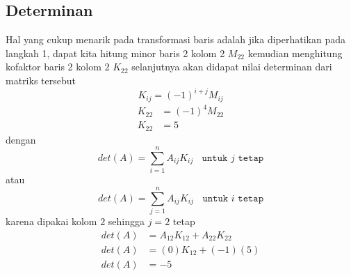 \documentclass{article}   %
\begin{document}
		\subsection[]{Determinan}Hal yang cukup menarik pada transformasi baris adalah jika diperhatikan pada langkah 1, dapat kita hitung minor baris 2 kolom 2 $M_{22}$ kemudian menghitung kofaktor baris 2 kolom 2 $K_{22}$ selanjutnya akan didapat nilai determinan dari matriks tersebut
		$$K_{ij} = (-1)^{i+j}M_{ij}$$
		\begin{align*}
			K_{22} &= (-1)^{4}M_{22}\\
			K_{22} &= 5
		\end{align*}
		dengan
		$$det(A)=\sum_{i=1}^{n} A_{ij}K_{ij}~~~~ \texttt{untuk $j$ tetap}$$
		atau 
		$$det(A)=\sum_{j=1}^{n} A_{ij}K_{ij}~~~~ \texttt{untuk $i$ tetap}$$
		karena dipakai kolom $2$ sehingga $j=2$ tetap
		\begin{align*}
			det(A)&=A_{12}K_{12} + A_{22}K_{22}\\
			det(A)&=(0)K_{12} + (-1)(5)\\
			det(A)&=-5
		\end{align*}
			
\end{document}
